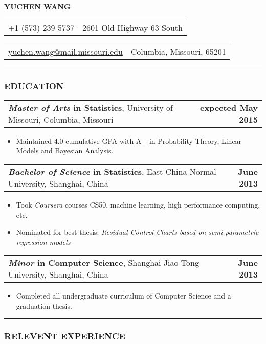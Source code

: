 \documentclass[11pt]{article}
\makeatletter
\newcommand{\headerrow}[2]
{\begin{tabular*}{\linewidth}{l@{\extracolsep{\fill}}r}
	#1 & #2 \\
\end{tabular*}
}
\makeatother
\begin{document}
\begin{center}
	\huge\textbf{YUCHEN WANG}
\end{center}

\noindent\headerrow{+1 (573) 239-5737}{2601 Old Highway 63 South}
\headerrow
{\href{mailto:yuchen.wang@mail.missouri.edu}{yuchen.wang@mail.missouri.edu}}
{Columbia, Missouri, 65201}

\vspace{-.8em}
\hrule

\subsubsection*{\centering EDUCATION}
\vspace{-.3em}

\headerrow
	{\textbf{\emph{Master of Arts} in Statistics}, University of Missouri, Columbia, Missouri}
	{\textbf{expected May 2015}}
	\begin{itemize}
		\item Maintained 4.0 cumulative GPA with A+ in Probability Theory, Linear Models and Bayesian Analysis.
	\end{itemize}

\noindent\headerrow
	{\textbf{\emph{Bachelor of Science} in Statistics}, East China Normal University, Shanghai, China}
	{\textbf{June 2013}}
	\begin{itemize}
		\item Took \emph{Coursera} courses CS50, machine learning, high performance computing, etc.
		\item Nominated for best thesis: \textit{Residual Control Charts based on semi-parametric regression models}
	\end{itemize}

\noindent\headerrow
	{\textbf{\emph{Minor} in Computer Science}, Shanghai Jiao Tong University, Shanghai, China}
	{\textbf{June 2013}}
	\begin{itemize}
		\item Completed all undergraduate curriculum of Computer Science and a graduation thesis.
	\end{itemize}


\vspace{0.2em}
\hrule


\subsubsection*{\centering RELEVENT EXPERIENCE}
\vspace{-.3em}
\end{document}
